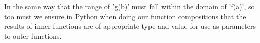 In the same way that the range of 'g(b)' must fall within the domain   of 'f(a)', so too must we ensure in Python when doing our function   compositions that the results of inner functions are of appropriate   type and value for use as parameters to outer functions.
% 
% 
% 
% 
% 
% 
% 
% 
